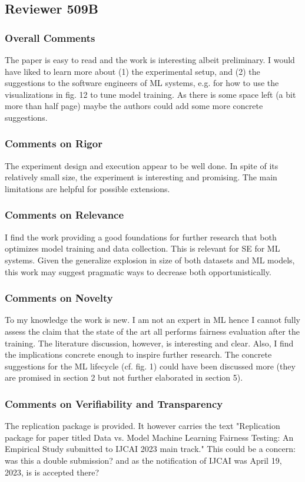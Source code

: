 \documentclass[conference,review,anonymous]{IEEEtran}
\begin{document}
\subsection{Reviewer 509B}

\subsubsection{Overall Comments}
The paper is easy to read and the work is interesting albeit
preliminary. I would have liked to learn more about (1) the
experimental setup, and (2) the suggestions to the software engineers
of ML systems, e.g. for how to use the visualizations in fig. 12 to
tune model training. As there is some space left (a bit more than half
page) maybe the authors could add some more concrete suggestions.

\subsubsection{Comments on Rigor}
The experiment design and execution appear to be well done. In spite
of its relatively small size, the experiment is interesting and
promising. The main limitations are helpful for possible extensions.

\subsubsection{Comments on Relevance}
I find the work providing a good foundations for further research that
both optimizes model training and data collection. This is relevant
for SE for ML systems. Given the generalize explosion in size of both
datasets and ML models, this work may suggest pragmatic ways to
decrease both opportunistically.

\subsubsection{Comments on Novelty}
To my knowledge the work is new. I am not an expert in ML hence
I cannot fully assess the claim that the state of the art all performs
fairness evaluation after the training. The literature discussion,
however, is interesting and clear. Also, I find the implications
concrete enough to inspire further research. The concrete suggestions
for the ML lifecycle (cf. fig. 1) could have been discussed more (they
are promised in section 2 but not further elaborated in section 5).

\subsubsection{Comments on Verifiability and Transparency}
The replication package is provided. It however carries the text
"Replication package for paper titled Data vs. Model Machine Learning
Fairness Testing: An Empirical Study submitted to IJCAI 2023 main
track." This could be a concern: was this a double submission? and as
the notification of IJCAI was April 19, 2023, is is accepted there?
\end{document}
